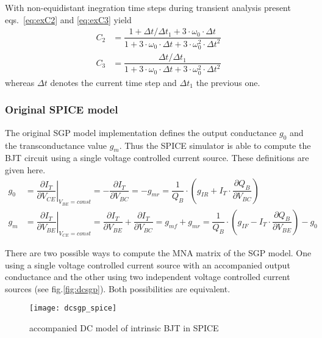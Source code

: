 \addvspace{12pt}

With non-equidistant inegration time steps during transient analysis
present eqs.~\eqref{eq:exC2} and \eqref{eq:exC3} yield
\begin{align}
C_2 &= \dfrac{1 + \Delta t/\Delta t_1 + 3\cdot\omega_0\cdot\Delta t}{1 + 3\cdot\omega_0\cdot\Delta t + 3\cdot\omega_0^2\cdot \Delta t^2}\\
C_3 &= \dfrac{\Delta t/\Delta t_1}{1 + 3\cdot\omega_0\cdot \Delta t + 3\cdot\omega_0^2\cdot \Delta t^2}
\end{align}
whereas $\Delta t$ denotes the current time step and $\Delta t_1$ the
previous one.

\subsubsection{Original SPICE model}

The original SGP model implementation defines the output conductance
$g_0$ and the transconductance value $g_m$.  Thus the SPICE simulator
is able to compute the BJT circuit using a single voltage controlled
current source.  These definitions are given here.
\begin{align}
\label{eq:SGPg0}
g_0 &= \left.\dfrac{\partial I_{T}}{\partial V_{CE}}\right|_{V_{BE} = const} = - \dfrac{\partial I_{T}}{\partial V_{BC}} = -g_{mr} = \dfrac{1}{Q_B}\cdot\left(g_{IR} + I_{T}\cdot\dfrac{\partial Q_B}{\partial V_{BC}}\right)\\
\label{eq:SGPgm}
g_m &= \left.\dfrac{\partial I_{T}}{\partial V_{BE}}\right|_{V_{CE} = const} = \dfrac{\partial I_{T}}{\partial V_{BE}} + \dfrac{\partial I_{T}}{\partial V_{BC}} = g_{mf} + g_{mr} = \dfrac{1}{Q_B}\cdot\left(g_{IF} - I_T\cdot\dfrac{\partial Q_B}{\partial V_{BE}}\right) - g_0
\end{align}

There are two possible ways to compute the MNA matrix of the SGP
model.  One using a single voltage controlled current source with an
accompanied output conductance and the other using two independent
voltage controlled current sources (see fig.\ref{fig:dcsgp}).  Both
possibilities are equivalent.
\begin{figure}[ht]
\begin{center}
\texttt{[image: dcsgp\_spice]}
\end{center}
\caption{accompanied DC model of intrinsic BJT in SPICE}
\label{fig:dcsgp_spice}
\end{figure}
\FloatBarrier

